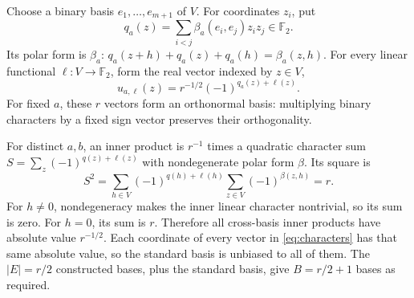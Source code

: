 \documentclass[11pt,letterpaper]{article}
\theoremstyle{definition}
\theoremstyle{remark}
\numberwithin{equation}{section}
\newcommand{\F}{\mathbb F}
\begin{document}
Choose a binary basis $e_1,\ldots,e_{m+1}$ of $V$. For coordinates $z_i$, put
\[
 q_a(z)=\sum_{i<j}\beta_a(e_i,e_j)z_iz_j\in\F_2.
\]
Its polar form is $\beta_a$: $q_a(z+h)+q_a(z)+q_a(h)=\beta_a(z,h)$. For every linear functional $\ell:V\to\F_2$, form the real vector indexed by $z\in V$,
\begin{equation}\label{eq:characters}
 u_{a,\ell}(z)=r^{-1/2}(-1)^{q_a(z)+\ell(z)}.
\end{equation}
For fixed $a$, these $r$ vectors form an orthonormal basis: multiplying binary characters by a fixed sign vector preserves their orthogonality.

For distinct $a,b$, an inner product is $r^{-1}$ times a quadratic character sum $S=\sum_z(-1)^{q(z)+\ell(z)}$ with nondegenerate polar form $\beta$. Its square is
\[
 S^2=\sum_{h\in V}(-1)^{q(h)+\ell(h)}\sum_{z\in V}(-1)^{\beta(z,h)}=r.
\]
For $h\ne0$, nondegeneracy makes the inner linear character nontrivial, so its sum is zero. For $h=0$, its sum is $r$. Therefore all cross-basis inner products have absolute value $r^{-1/2}$. Each coordinate of every vector in \eqref{eq:characters} has that same absolute value, so the standard basis is unbiased to all of them. The $|E|=r/2$ constructed bases, plus the standard basis, give $B=r/2+1$ bases as required.
\end{document}
